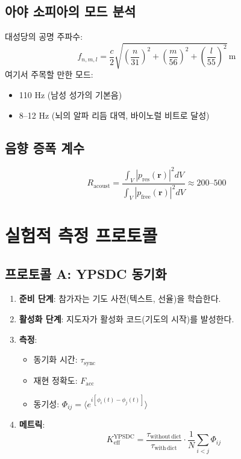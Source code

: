 \documentclass[12pt,a4paper]{article}
\begin{document}
	\subsection{아야 소피아의 모드 분석}
	
	대성당의 공명 주파수:
	\[
	f_{n,m,l} = \frac{c}{2} \sqrt{\left(\frac{n}{31}\right)^2 + \left(\frac{m}{56}\right)^2 + \left(\frac{l}{55}\right)^2} \, \mathrm{m}
	\]
	여기서 주목할 만한 모드:
	\begin{itemize}
		\item 110 Hz (남성 성가의 기본음)
		\item 8–12 Hz (뇌의 알파 리듬 대역, 바이노럴 비트로 달성)
	\end{itemize}
	
	\subsection{음향 증폭 계수}
	\[
	R_{\mathrm{acoust}} = \frac{\int_V |p_{\mathrm{res}}(\mathbf{r})|^2 dV}{\int_V |p_{\mathrm{free}}(\mathbf{r})|^2 dV} \approx 200\text{--}500
	\]
	
	\section{실험적 측정 프로토콜}
	
	\subsection{프로토콜 A: YPSDC 동기화}
	
	\begin{enumerate}
		\item \textbf{준비 단계}: 참가자는 기도 사전(텍스트, 선율)을 학습한다.
		\item \textbf{활성화 단계}: 지도자가 활성화 코드(기도의 시작)를 발성한다.
		\item \textbf{측정}:
		\begin{itemize}
			\item 동기화 시간: $\tau_{\mathrm{sync}}$
			\item 재현 정확도: $F_{\mathrm{acc}}$
			\item 동기성: $\Phi_{ij} = \langle e^{i[\phi_i(t) - \phi_j(t)]} \rangle$
		\end{itemize}
		\item \textbf{메트릭}:
		\[
		K_{\mathrm{eff}}^{\mathrm{YPSDC}} = \frac{\tau_{\mathrm{without\,dict}}}{\tau_{\mathrm{with\,dict}}} \cdot \frac{1}{N} \sum_{i<j} \Phi_{ij}
		\]
	\end{enumerate}
	
\end{document}
